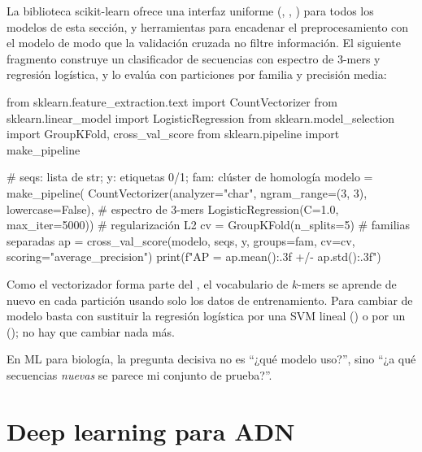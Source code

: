 La biblioteca scikit-learn \parencite{c17-pedregosa2011} ofrece una interfaz uniforme (, , ) para todos los modelos de esta sección, y herramientas para encadenar el preprocesamiento con el modelo de modo que la validación cruzada no filtre información. El siguiente fragmento construye un clasificador de secuencias con espectro de 3-mers y regresión logística, y lo evalúa con particiones por familia y precisión media:

\begin{codigo}
from sklearn.feature_extraction.text import CountVectorizer
from sklearn.linear_model import LogisticRegression
from sklearn.model_selection import GroupKFold, cross_val_score
from sklearn.pipeline import make_pipeline

# seqs: lista de str; y: etiquetas 0/1; fam: clúster de homología
modelo = make_pipeline(
    CountVectorizer(analyzer="char", ngram_range=(3, 3),
                    lowercase=False),          # espectro de 3-mers
    LogisticRegression(C=1.0, max_iter=5000))  # regularización L2
cv = GroupKFold(n_splits=5)                    # familias separadas
ap = cross_val_score(modelo, seqs, y, groups=fam, cv=cv,
                     scoring="average_precision")
print(f"AP = {ap.mean():.3f} +/- {ap.std():.3f}")
\end{codigo}

Como el vectorizador forma parte del , el vocabulario de $k$-mers se aprende de nuevo en cada partición usando solo los datos de entrenamiento. Para cambiar de modelo basta con sustituir la regresión logística por una SVM lineal () o por un  (); no hay que cambiar nada más.

\begin{ideaclave}
En ML para biología, la pregunta decisiva no es ``¿qué modelo uso?'', sino ``¿a qué secuencias \emph{nuevas} se parece mi conjunto de prueba?''.
\end{ideaclave}

\section{Deep learning para ADN}\label{sec:17-dl}

